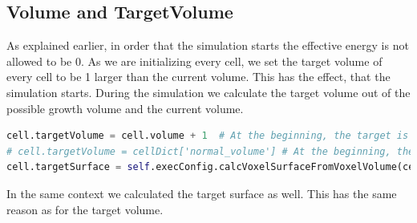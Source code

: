\subsection{Volume and TargetVolume}
As explained earlier, in order that the simulation starts the effective energy is not allowed to be 0. As we are initializing every cell, we set the target volume of every cell to be 1 larger than the current volume. This has the effect, that the simulation starts. During the simulation we calculate the target volume out of the possible growth volume and the current volume.
\begin{lstlisting}[language=Python, caption = set target Volume and Surface of a cell]
cell.targetVolume = cell.volume + 1  # At the beginning, the target is the actual size.
# cell.targetVolume = cellDict['normal_volume'] # At the beginning, the target is the actual size.
cell.targetSurface = self.execConfig.calcVoxelSurfaceFromVoxelVolume(cell.targetVolume)
\end{lstlisting}
In the same context we calculated the target surface as well. This has the same reason as for the target volume. 
